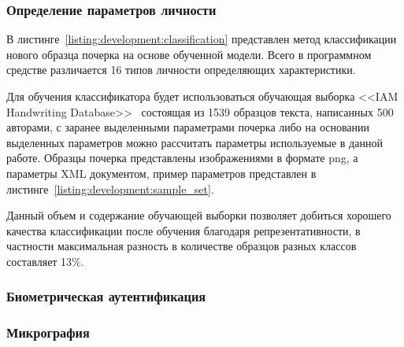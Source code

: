 \subsubsection{Определение параметров личности}
В листинге~\ref{listing:development:classification} представлен метод классификации нового образца почерка на основе обученной модели. Всего в программном средстве различается 16 типов личности определяющих характеристики.



Для обучения классификатора будет использоваться обучающая выборка <<IAM Handwriting Database>>~\cite{IAM_handwriting_database} состоящая из 1539 образцов текста, написанных 500 авторами, с заранее выделенными параметрами почерка либо на основании выделенных параметров можно рассчитать параметры используемые в данной работе. Образцы почерка представлены изображениями в формате png, а параметры XML документом, пример параметров представлен в листинге~\ref{listing:development:sample_set}.


Данный объем и содержание обучающей выборки позволяет добиться хорошего качества классификации после обучения благодаря репрезентативности, в частности максимальная разность в количестве образцов разных классов составляет 13\%.

\subsubsection{Биометрическая аутентификация}
\subsubsection{Микрография}

